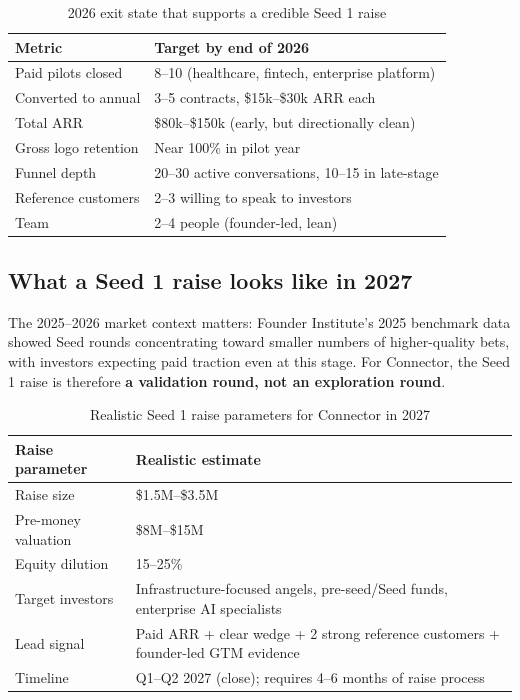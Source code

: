 \begin{table}[H]
\centering
\renewcommand{\arraystretch}{1.45}
\begin{tabularx}{\textwidth}{@{}lX@{}}
\toprule
\textbf{Metric} & \textbf{Target by end of 2026} \\
\midrule
Paid pilots closed & 8--10 (healthcare, fintech, enterprise platform) \\
Converted to annual & 3--5 contracts, \$15k--\$30k ARR each \\
Total ARR & \$80k--\$150k (early, but directionally clean) \\
Gross logo retention & Near 100\% in pilot year \\
Funnel depth & 20--30 active conversations, 10--15 in late-stage \\
Reference customers & 2--3 willing to speak to investors \\
Team & 2--4 people (founder-led, lean) \\
\bottomrule
\end{tabularx}
\caption{2026 exit state that supports a credible Seed 1 raise}
\end{table}

\subsection{What a Seed 1 raise looks like in 2027}

The 2025--2026 market context matters: Founder Institute's 2025 benchmark data
showed Seed rounds concentrating toward smaller numbers of higher-quality bets,
with investors expecting paid traction even at this stage. For Connector, the
Seed 1 raise is therefore \textbf{a validation round, not an exploration round}.

\begin{table}[H]
\centering
\renewcommand{\arraystretch}{1.45}
\begin{tabularx}{\textwidth}{@{}lX@{}}
\toprule
\textbf{Raise parameter} & \textbf{Realistic estimate} \\
\midrule
Raise size & \$1.5M--\$3.5M \\
Pre-money valuation & \$8M--\$15M \\
Equity dilution & 15--25\% \\
Target investors & Infrastructure-focused angels, pre-seed/Seed funds, enterprise AI specialists \\
Lead signal & Paid ARR + clear wedge + 2 strong reference customers + founder-led GTM evidence \\
Timeline & Q1--Q2 2027 (close); requires 4--6 months of raise process \\
\bottomrule
\end{tabularx}
\caption{Realistic Seed 1 raise parameters for Connector in 2027}
\end{table}

